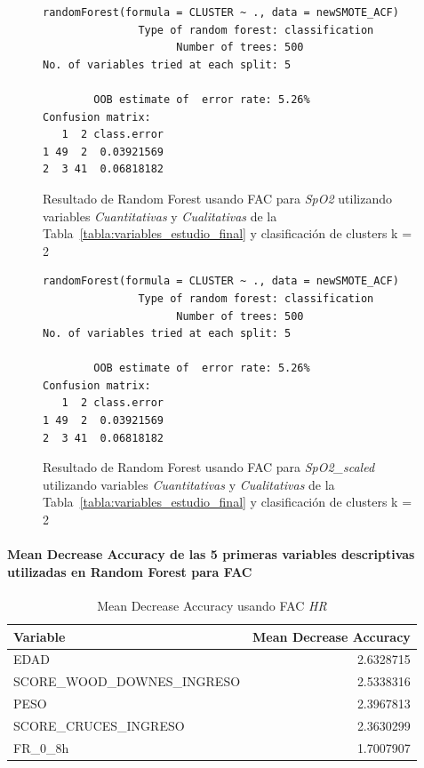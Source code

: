 \begin{figure}[H]
    \centering
    \begin{lstlisting}[frame=single, basicstyle=\small\ttfamily]
        randomForest(formula = CLUSTER ~ ., data = newSMOTE_ACF) 
               Type of random forest: classification
                     Number of trees: 500
No. of variables tried at each split: 5

        OOB estimate of  error rate: 5.26%
Confusion matrix:
   1  2 class.error
1 49  2  0.03921569
2  3 41  0.06818182
    \end{lstlisting}
    \caption{Resultado de Random Forest usando FAC para \textit{SpO2} utilizando variables \textit{Cuantitativas} y \textit{Cualitativas} de la Tabla~\ref{tabla:variables_estudio_final} y clasificación de clusters k = 2}\label{fig:random_forest_acf_result_4}
\end{figure}
\begin{figure}[H]
    \centering
    \begin{lstlisting}[frame=single, basicstyle=\small\ttfamily]
        randomForest(formula = CLUSTER ~ ., data = newSMOTE_ACF) 
               Type of random forest: classification
                     Number of trees: 500
No. of variables tried at each split: 5

        OOB estimate of  error rate: 5.26%
Confusion matrix:
   1  2 class.error
1 49  2  0.03921569
2  3 41  0.06818182
    \end{lstlisting}
    \caption{Resultado de Random Forest usando FAC para \textit{SpO2\_scaled} utilizando variables \textit{Cuantitativas} y \textit{Cualitativas} de la Tabla~\ref{tabla:variables_estudio_final} y clasificación de clusters k = 2}
    \label{fig:random_forest_acf_result_5}
\end{figure}

\paragraph{Mean Decrease Accuracy de las 5 primeras variables descriptivas utilizadas en Random Forest para FAC}

\begin{table}[H]
    \centering
    \begin{tabular}{lr}
        \toprule
        \textbf{Variable} & \textbf{Mean Decrease Accuracy} \\
        \midrule
        EDAD & 2.6328715 \\
        SCORE\_WOOD\_DOWNES\_INGRESO & 2.5338316 \\
        PESO & 2.3967813 \\
        SCORE\_CRUCES\_INGRESO & 2.3630299 \\
        FR\_0\_8h & 1.7007907 \\
        \bottomrule
    \end{tabular}
    \caption{Mean Decrease Accuracy usando FAC \textit{HR}}
\end{table}

